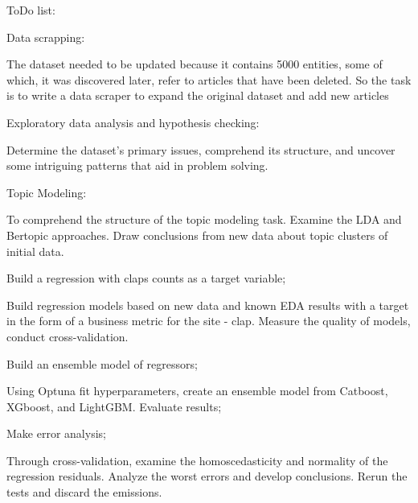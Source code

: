 \documentclass[12pt]{report}
\newcommand{\xmark}{\ding{55}}%
\newcommand{\wontfix}{\rlap{$\square$}{\large\hspace{1pt}\xmark}}
\begin{document}
{\Large ToDo list}:
\begin{todolist}
  \item[\wontfix] Data scrapping:
  
  The dataset needed to be updated because it contains 5000 entities, some of which, it was discovered later, refer to articles that have been deleted. So the task is to write a data scraper to expand the original dataset and add new articles
  \item[\wontfix] Exploratory data analysis and hypothesis checking:
  
    Determine the dataset's primary issues, comprehend its structure, and uncover some intriguing patterns that aid in problem solving.
  \item[\wontfix] Topic Modeling:
  
  To comprehend the structure of the topic modeling task. Examine the LDA and Bertopic approaches. Draw conclusions from new data about topic clusters of initial data.
  \item[\wontfix] Build a regression with claps counts as a target variable;

  
  Build regression models based on new data and known EDA results with a target in the form of a business metric for the site - clap. Measure the quality of models, conduct cross-validation.

  \item[\wontfix] Build an ensemble model of regressors;

  Using Optuna fit hyperparameters, create an ensemble model from Catboost, XGboost, and LightGBM. Evaluate results;

  \item[\wontfix] Make error analysis;

  Through cross-validation, examine the homoscedasticity and normality of the regression residuals. Analyze the worst errors and develop conclusions. Rerun the tests and discard the emissions.
\end{todolist}

\newpage
\end{document}
